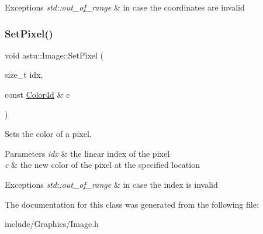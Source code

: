 \begin{DoxyExceptions}{Exceptions}
{\em std\+::out\+\_\+of\+\_\+range} & in case the coordinates are invalid \\
\hline
\end{DoxyExceptions}
\mbox{\label{classastu_1_1Image_aa3121a767b7ef35e3ea9d22d6d856f27}} 
\subsubsection{\texorpdfstring{Set\+Pixel()}{SetPixel()}\hspace{0.1cm}{\footnotesize\ttfamily [2/2]}}
{\footnotesize\ttfamily void astu\+::\+Image\+::\+Set\+Pixel (\begin{DoxyParamCaption}\item[{size\+\_\+t}]{idx,  }\item[{const \hyperlink{classastu_1_1Color}{Color4d} \&}]{c }\end{DoxyParamCaption})}

Sets the color of a pixel.


\begin{DoxyParams}{Parameters}
{\em idx} & the linear index of the pixel \\
\hline
{\em c} & the new color of the pixel at the specified location \\
\hline
\end{DoxyParams}

\begin{DoxyExceptions}{Exceptions}
{\em std\+::out\+\_\+of\+\_\+range} & in case the index is invalid \\
\hline
\end{DoxyExceptions}


The documentation for this class was generated from the following file\+:\begin{DoxyCompactItemize}
\item 
include/\+Graphics/Image.\+h\end{DoxyCompactItemize}

